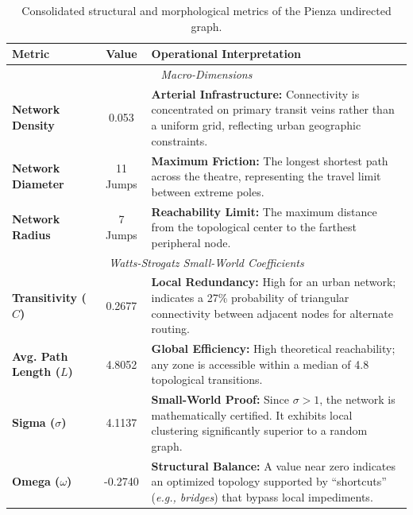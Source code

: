 \begin{table}[H]
    \centering
    \small
    \begin{tabularx}{\textwidth}{l c X}
        \toprule
        \textbf{Metric} & \textbf{Value} & \textbf{Operational Interpretation} \\
        \midrule
        \multicolumn{3}{c}{\textit{Macro-Dimensions}} \\
        \midrule
        \textbf{Network Density} & 0.053 & \textbf{Arterial Infrastructure:} Connectivity is concentrated on primary transit veins rather than a uniform grid, reflecting urban geographic constraints. \\
        \addlinespace
        \textbf{Network Diameter} & 11 Jumps & \textbf{Maximum Friction:} The longest shortest path across the theatre, representing the travel limit between extreme poles. \\
        \addlinespace
        \textbf{Network Radius} & 7 Jumps & \textbf{Reachability Limit:} The maximum distance from the topological center to the farthest peripheral node. \\
        \midrule
        \multicolumn{3}{c}{\textit{Watts-Strogatz Small-World Coefficients}} \\
        \midrule
        \textbf{Transitivity ($C$)} & 0.2677 & \textbf{Local Redundancy:} High for an urban network; indicates a 27\% probability of triangular connectivity between adjacent nodes for alternate routing. \\
        \addlinespace
        \textbf{Avg. Path Length ($L$)} & 4.8052 & \textbf{Global Efficiency:} High theoretical reachability; any zone is accessible within a median of 4.8 topological transitions. \\
        \addlinespace
        \textbf{Sigma ($\sigma$)} & 4.1137 & \textbf{Small-World Proof:} Since $\sigma > 1$, the network is mathematically certified. It exhibits local clustering significantly superior to a random graph. \\
        \addlinespace
        \textbf{Omega ($\omega$)} & -0.2740 & \textbf{Structural Balance:} A value near zero indicates an optimized topology supported by ``shortcuts'' (\textit{e.g., bridges}) that bypass local impediments. \\
        \bottomrule
    \end{tabularx}
    \caption{Consolidated structural and morphological metrics of the Pienza undirected graph.}
    \label{tab:structural_metrics}
\end{table}

